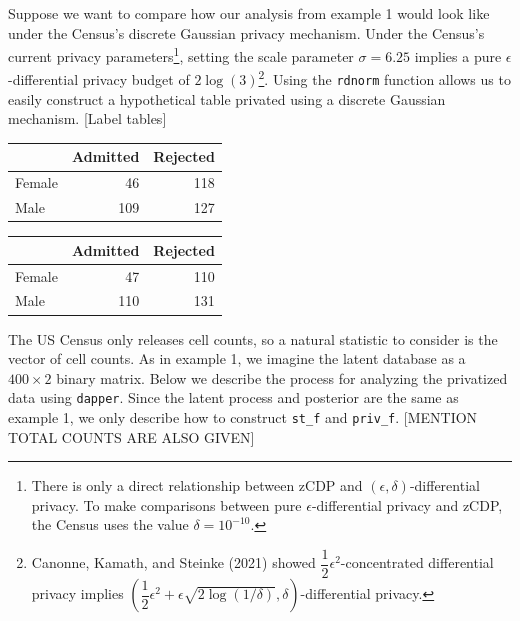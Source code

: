 Suppose we want to compare how our analysis from example 1 would look like
under the Census's discrete Gaussian privacy mechanism. Under the Census's
current privacy
parameters\footnote{There is only a direct relationship between zCDP and \((\epsilon, \delta)\)-differential privacy. To make comparisons between pure \(\epsilon\)-differential privacy and zCDP, the Census uses the value \(\delta = 10^{-10}\).}, setting
the scale parameter \(\sigma = 6.25\) implies a pure \(\epsilon\)-differential
privacy budget of \(2\log(3)\)\footnote{Canonne, Kamath, and Steinke (2021) showed \(\dfrac{1}{2} \epsilon^2\)-concentrated differential privacy implies \(\left(\dfrac{1}{2}\epsilon^2 + \epsilon \sqrt{2\log(1/\delta)}, \delta\right)\)-differential privacy.}. Using the \texttt{rdnorm} function allows
us to easily construct a hypothetical table privated using a discrete
Gaussian mechanism. {[}Label tables{]}

\begin{table}[!h]
\centering\caption{\label{tab:unnamed-chunk-14}Left table represents a random sub-sample of 400
    observations from the UCBAdmissions data set. The table on the right reprents
    the left table with independent discrete Gaussian noise added to each cell.}
\begin{table}

\centering
\begin{tabular}[t]{lrr}
\toprule
  & Admitted & Rejected\\
\midrule
Female & 46 & 118\\
Male & 109 & 127\\
\bottomrule
\end{tabular}
\end{table}\begin{table}

\centering
\begin{tabular}[t]{lrr}
\toprule
  & Admitted & Rejected\\
\midrule
Female & 47 & 110\\
Male & 110 & 131\\
\bottomrule
\end{tabular}
\end{table}
\end{table}

The US Census only releases cell counts, so a natural
statistic to consider is the vector of cell counts. As in
example 1, we imagine the latent database as a
\(400 \times 2\) binary matrix. Below
we describe the process for analyzing the privatized
data using \texttt{dapper}. Since the latent process
and posterior are the same as example 1, we only describe
how to construct \texttt{st\_f} and \texttt{priv\_f}. {[}MENTION TOTAL COUNTS ARE ALSO GIVEN{]}


